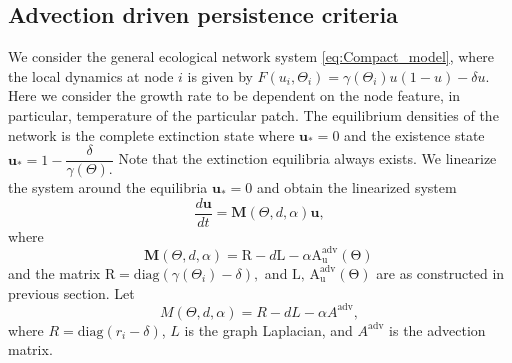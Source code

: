 \documentclass[12pt]{article}
\begin{document}
\subsection{Advection driven persistence criteria }
We consider the general ecological network system \eqref{eq:Compact_model}, where the local dynamics at node $i$ is given by $F(u_i,\Theta_i) = \gamma(\Theta_i)u(1-u)-\delta u.$ Here we consider the growth rate to be dependent on the node feature, in particular, temperature of the particular patch. The equilibrium densities of the network is the complete extinction state where $\textbf{u}_*=0$ and the existence state $\textbf{u}_* = 1-\dfrac{\delta}{\gamma(\Theta).}$ Note that the extinction equilibria always exists. We linearize the system around the equilibria $\textbf{u}_*=0$ and obtain the linearized system 
\begin{equation}\label{eq:Linearized_model}
    \frac{d \mathbf{u}}{dt}
=
\mathbf{M}(\Theta,d,\alpha) \mathbf{u},
\end{equation}
where 
\begin{equation}
    \mathbf{M}(\Theta,d,\alpha)  = \mathrm{R}-d \mathrm{L}
- \alpha \mathrm{A_u^{adv}(\Theta)}\,
\end{equation}
and the matrix $\mathrm{R} = \mathrm{diag}(\gamma(\Theta_i)-\delta),$ and $\mathrm{L},\, \mathrm{A_u^{adv}(\Theta)}$ are as constructed in previous section. 
Let
\[
M(\Theta, d, \alpha) = R - dL - \alpha A^{\mathrm{adv}},
\]
where $R = \mathrm{diag}(r_i - \delta)$, $L$ is the graph Laplacian, and $A^{\mathrm{adv}}$ is the advection matrix.
\end{document}
